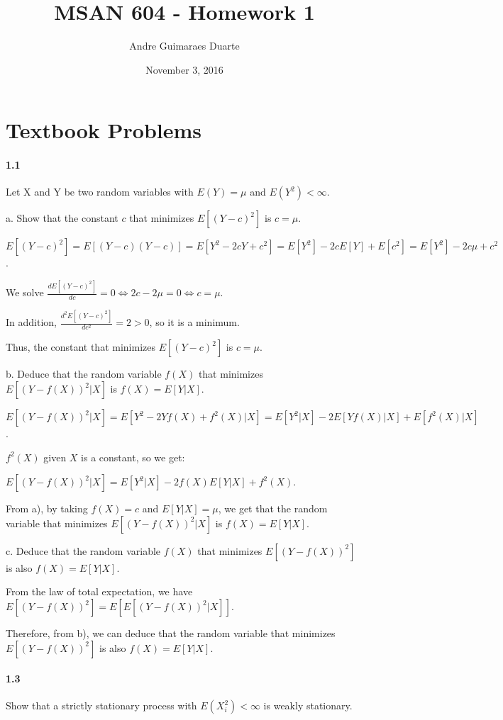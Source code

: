 \documentclass[]{article}
\title{MSAN 604 - Homework 1}
\author{Andre Guimaraes Duarte}
\date{November 3, 2016}
\let\oldparagraph\paragraph
\renewcommand{\paragraph}[1]{\oldparagraph{#1}\mbox{}}
\begin{document}
\maketitle

\section{Textbook Problems}
\paragraph{1.1}
Let X and Y be two random variables with $E(Y) = \mu$ and $E(Y^2) < \infty$.

a. Show that the constant $c$ that minimizes $E[(Y - c)^2]$ is $c = \mu$.

\color{blue}
$E[(Y-c)^2] = E[(Y-c)(Y-c)]
            = E[Y^2 - 2cY + c^2]
            = E[Y^2] - 2cE[Y] + E[c^2]
            = E[Y^2] - 2c\mu + c^2$.

We solve $\frac{d E[(Y-c)^2]}{d c} = 0 \Leftrightarrow 2c - 2\mu = 0 \Leftrightarrow c = \mu$.

In addition, $\frac{d^2 E[(Y-c)^2]}{d c^2} = 2 > 0$, so it is a minimum.

Thus, the constant that minimizes $E[(Y - c)^2]$ is $c = \mu$.
\color{black}

b. Deduce that the random variable $f(X)$ that minimizes $E[(Y - f(X))^2|X]$ is $f(X) = E[Y|X]$.

\color{blue}
$E[(Y - f(X))^2|X] = E[Y^2 - 2Yf(X) + f^2(X)|X]
                   = E[Y^2|X] - 2E[Yf(X)|X] + E[f^2(X)|X]$.

$f^2(X)$ given $X$ is a constant, so we get:

$E[(Y - f(X))^2|X] = E[Y^2|X] - 2f(X)E[Y|X] + f^2(X)$.

From a), by taking $f(X) = c$ and $E[Y|X] = \mu$, we get that the random variable that minimizes $E[(Y - f(X))^2|X]$ is $f(X) = E[Y|X]$.
\color{black}

c. Deduce that the random variable $f(X)$ that minimizes $E[(Y - f(X))^2]$ is also $f(X) = E[Y|X]$.

\color{blue}
From the law of total expectation, we have $E[(Y - f(X))^2] = E[E[(Y - f(X))^2|X]]$.

Therefore, from b), we can deduce that the random variable that minimizes $E[(Y - f(X))^2]$ is also $f(X) = E[Y|X]$.
\color{black}


\paragraph{1.3}
Show that a strictly stationary process with $E(X_i^2) < \infty$ is weakly stationary.
\end{document}
